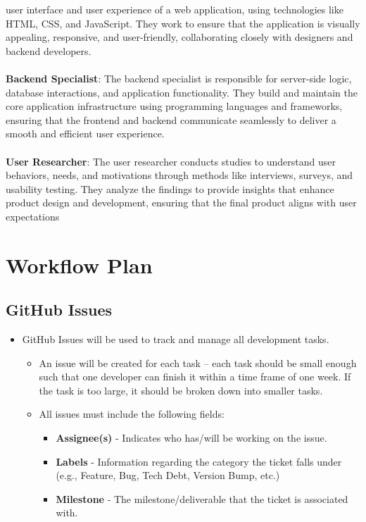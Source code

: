 \documentclass{article}
\begin{document}
user interface and user experience of a web application, using technologies like
HTML, CSS, and JavaScript. They work to ensure that the application is visually
appealing, responsive, and user-friendly, collaborating closely with designers
and backend developers. \\
\\
\textbf{Backend Specialist}: The backend specialist is responsible for
server-side logic, database interactions, and application functionality. They
build and maintain the core application infrastructure using programming
languages and frameworks, ensuring that the frontend and backend communicate
seamlessly to deliver a smooth and efficient user experience. \\
\\
\textbf{User Researcher}: The user researcher conducts studies to understand
user behaviors, needs, and motivations through methods like interviews, surveys,
and usability testing. They analyze the findings to provide insights that
enhance product design and development, ensuring that the final product aligns
with user expectations

\newpage

\section{Workflow Plan}

\subsection{GitHub Issues}
\begin{itemize}
    \item GitHub Issues will be used to track and manage all development tasks.
    \begin{itemize}
        \item An issue will be created for each task -- each task should be
        small enough such that one developer can finish it within a time frame
        of one week. If the task is too large, it should be broken down into
        smaller tasks.
        \item All issues must include the following fields:
        \begin{itemize}
            \item \textbf{Assignee(s)} - Indicates who has/will be working on
            the issue.
            \item \textbf{Labels} - Information regarding the category the
            ticket falls under (e.g., Feature, Bug, Tech Debt, Version Bump,
            etc.)
            \item \textbf{Milestone} - The milestone/deliverable that the ticket
            is associated with.
        \end{itemize}
    \end{itemize}
\end{itemize}
\end{document}
